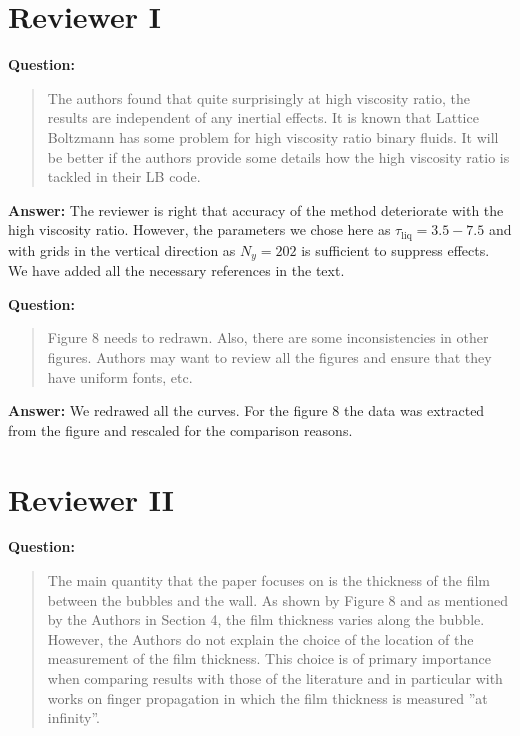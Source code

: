 \documentclass{article}
\begin{document}
\section{Reviewer I}

\textbf{Question:}
\begin{quotation}
The authors found that quite surprisingly at high viscosity ratio, the results are
independent of any inertial effects. It is known that Lattice Boltzmann has some problem for high
viscosity ratio binary fluids. It will be better if the authors provide some details how the high
viscosity ratio is tackled in their LB code.
\end{quotation}

\textbf{Answer:} The reviewer is right that accuracy of the method deteriorate with the high
viscosity ratio. However, the parameters we chose here as $\tau_{\mathrm{liq}}=3.5-7.5$ and with
grids in the vertical direction as $N_y=202$ is sufficient to suppress effects. We have added all
the necessary references in the text.

\textbf{Question:}
\begin{quotation}
Figure 8 needs to redrawn. Also, there are some inconsistencies in other figures. Authors may
want to review all the figures and ensure that they have uniform fonts, etc.
\end{quotation}

\textbf{Answer:} We redrawed all the curves. For the figure 8 the data was extracted from the
figure and rescaled for the comparison reasons.

\section{Reviewer II}

\textbf{Question:}
\begin{quotation}
The main quantity that the paper focuses on is the thickness of the film between the bubbles and the
wall. As shown by Figure 8 and as mentioned by the Authors in Section 4, the film thickness varies
along the bubble. However, the Authors do not explain the choice of the location of the measurement
of the film thickness. This choice is of primary importance when comparing results with those of
the
literature and in particular with works on finger propagation in which the film thickness is
measured
”at infinity”.
\end{quotation}
\end{document}
